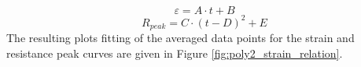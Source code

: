 \begin{equation}
	\varepsilon = A \cdot t + B
	\label{eqn:strain-t-lin-fit}
\end{equation}
\begin{equation}
	R_{peak} = C \cdot (t - D)^2 + E
	\label{eqn:res-t-ploy2-fit}
\end{equation}
The resulting plots fitting of the averaged data points for the strain and resistance peak curves are given in Figure \ref{fig:poly2_strain_relation}.
\begin{figure}[H]
	\centering
	\begin{minipage}[t]{.49\textwidth}
		\centering
		\vfill
	\end{minipage}
	\begin{minipage}[t]{.49\textwidth}
		\centering

\end{minipage}
\end{figure}

